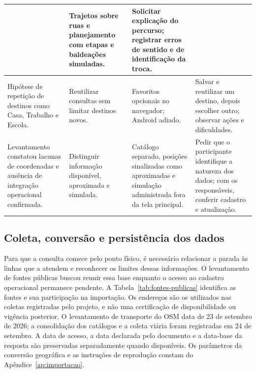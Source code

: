 \documentclass[12pt,oneside,a4paper,brazil]{abntex2}
\begin{document}
\begin{longtable}{>{\raggedright\arraybackslash}p{}>{\raggedright\arraybackslash}p{}>{\raggedright\arraybackslash}p{}>{\raggedright\arraybackslash}p{}}
& Trajetos sobre ruas e planejamento com etapas e baldeações simuladas.
& Solicitar explicação do percurso; registrar erros de sentido e de identificação da troca.\\
\hline
Hipótese de repetição de destinos como Casa, Trabalho e Escola.
& Reutilizar consultas sem limitar destinos novos.
& Favoritos opcionais no navegador; Android adiado.
& Salvar e reutilizar um destino, depois escolher outro; observar ações e dificuldades.\\
\hline
Levantamento constatou lacunas de coordenadas e ausência de integração operacional confirmada.
& Distinguir informação disponível, aproximada e simulada.
& Catálogo separado, posições sinalizadas como aproximadas e simulação administrada fora da tela principal.
& Pedir que o participante identifique a natureza dos dados; com os responsáveis, conferir cadastro e atualização.\\
\end{longtable}
\endgroup

\subsection{Coleta, conversão e persistência dos dados}
\label{sec:conversao}
Para que a consulta comece pelo ponto físico, é necessário relacionar a parada às linhas que a atendem e reconhecer os limites dessas informações. O levantamento de fontes públicas buscou reunir essa base enquanto o acesso ao cadastro operacional permanece pendente. A Tabela~\ref{tab:fontes-publicas} identifica as fontes e sua participação na importação. Os endereços são os utilizados nas coletas registradas pelo projeto, e não uma certificação de disponibilidade ou vigência posterior. O levantamento de transporte do OSM data de 23 de setembro de 2026; a consolidação dos catálogos e a coleta viária foram registradas em 24 de setembro. A data de acesso, a data declarada pelo documento e a data-base da resposta são preservadas separadamente quando disponíveis. Os parâmetros da conversão geográfica e as instruções de reprodução constam do Apêndice~\ref{ap:importacao}.
\end{document}
